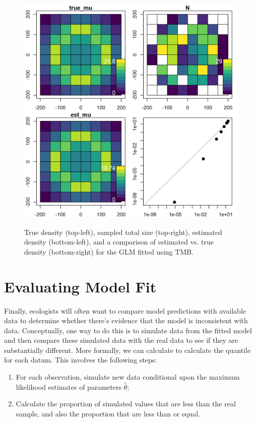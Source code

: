 \begin{figure}[!ht]
    \caption[Simulation and estimate of gridded above-ground density]{True density (top-left), sampled total size (top-right), estimated density (bottom-left), and a comparison of estimated vs. true density (bottom-right) for the GLM fitted using TMB.}
    \centering
    \includegraphics[width=5.5in]{Chap_1/estimated_density_res50.png}
    \label{fig:Chap1_estimated_density}
\end{figure}

\section{Evaluating Model Fit} \label{sec:Chap1_evaluating_model_fit}

Finally, ecologists will often want to compare model predictions with available data to determine whether there's evidence that the model is inconsistent with data.  Conceptually, one way to do this is to simulate data from the fitted model and then compare these simulated data with the real data to see if they are substantially different.  More formally, we can calculate  to calculate the quantile for each datum.  This involves the following steps:
\begin{enumerate}
    \item For each observation, simulate new data conditional upon the maximum likelihood estimates of parameters \( \hat{\theta} \);

    \item Calculate the proportion of simulated values that are less than the real sample, and also the proportion that are less than or equal.
\end{enumerate}

